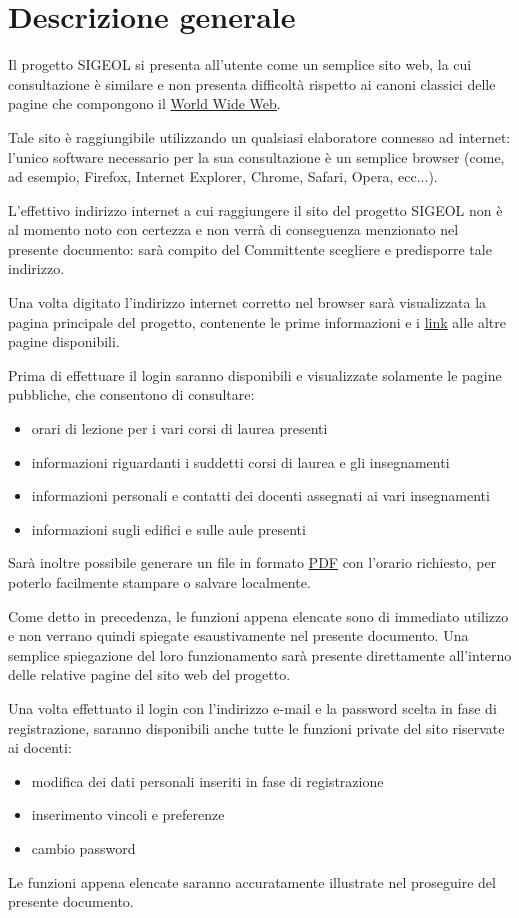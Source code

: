 \documentclass[11pt,a4paper]{article}
\begin{document}
\section{Descrizione generale}
Il progetto SIGEOL si presenta all'utente come un semplice sito web, la cui consultazione è similare e non presenta difficoltà rispetto ai canoni classici delle pagine che compongono il \underline{World Wide Web}.

Tale sito è raggiungibile utilizzando un qualsiasi elaboratore connesso ad internet: l'unico software necessario per la sua consultazione è un semplice browser (come, ad esempio, Firefox, Internet Explorer, Chrome, Safari, Opera, ecc...).

L'effettivo indirizzo internet a cui raggiungere il sito del progetto SIGEOL non è al momento noto con certezza e non verrà di conseguenza menzionato nel presente documento: sarà compito del Committente scegliere e predisporre tale indirizzo.

Una volta digitato l'indirizzo internet corretto nel browser sarà visualizzata la pagina principale del progetto, contenente le prime informazioni e i \underline{link} alle altre pagine disponibili.

Prima di effettuare il login saranno disponibili e visualizzate solamente le pagine pubbliche, che consentono di consultare:
\begin{itemize}
 \item orari di lezione per i vari corsi di laurea presenti
 \item informazioni riguardanti i suddetti corsi di laurea e gli insegnamenti
 \item informazioni personali e contatti dei docenti assegnati ai vari insegnamenti
 \item informazioni sugli edifici e sulle aule presenti
\end{itemize}
Sarà inoltre possibile generare un file in formato \underline{PDF} con l'orario richiesto, per poterlo facilmente stampare o salvare localmente.

Come detto in precedenza, le funzioni appena elencate sono di immediato utilizzo e non verrano quindi spiegate esaustivamente nel presente documento.
Una semplice spiegazione del loro funzionamento sarà presente direttamente all'interno delle relative pagine del sito web del progetto.

\bigskip
Una volta effettuato il login con l'indirizzo e-mail e la password scelta in fase di registrazione, saranno disponibili anche tutte le funzioni private del sito riservate ai docenti:
\begin{itemize}
 \item modifica dei dati personali inseriti in fase di registrazione
 \item inserimento vincoli e preferenze
 \item cambio password
\end{itemize}
Le funzioni appena elencate saranno accuratamente illustrate nel proseguire del presente documento.
\end{document}
